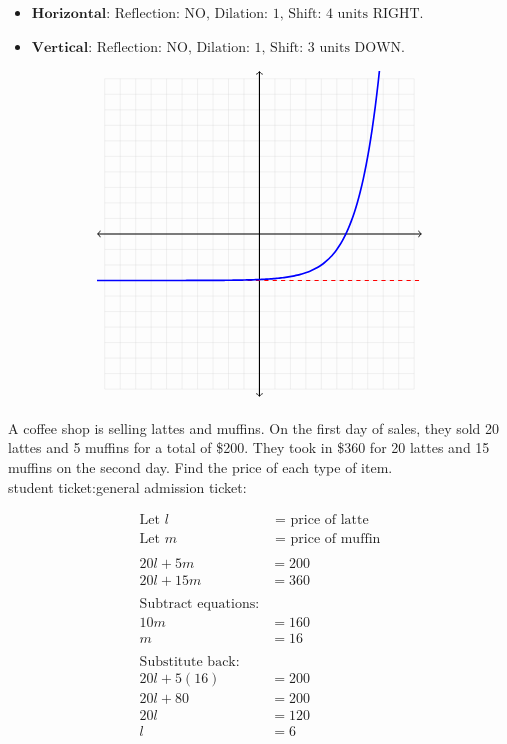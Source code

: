 \documentclass[addpoints]{exam}
\begin{document}
\begin{questions}
\begin{center}
\end{center}
\begin{solution}
\begin{itemize}
\item
 \(\textbf{Horizontal: } \text{Reflection: NO, Dilation: 1, Shift: 4 units RIGHT.}\) 

\item
 \(\textbf{Vertical: } \text{Reflection: NO, Dilation: 1, Shift: 3 units DOWN.}\) 

\end{itemize}


 \[\begin{tikzpicture}[scale=0.39] \draw[step=1cm, gray!40, very thin] (-10,-10) grid (10,10); \draw[thick, <->] (-10.5,0) -- (10.5,0); \draw[thick, <->] (0,-10.5) -- (0,10.5); \clip (-10.5,-10.5) rectangle (10.5,10.5);\draw[dashed, red, thick] (-10.5, -3) -- (10.5, -3);\draw[blue, very thick, samples=100, domain=-10.5000000000000:8.643856189774723, smooth] plot (\x, {pow(2, \x - (4)) + (-3)});\end{tikzpicture}\]
\end{solution}
\newpage


\question[6]  A coffee shop is selling lattes and muffins. On the first day of sales, they sold 20 lattes and 5 muffins for a total of \$200. They took in \$360 for 20 lattes and 15 muffins on the second day. Find the price of each type of item.
\\
student ticket:\fillin{}general admission ticket:\fillin
\begin{solution}
\[\begin{aligned} \text{Let } l &\text{ = price of latte} \\ \text{Let } m &\text{ = price of muffin} \\ \\ 20l + 5m &= 200 \\ 20l + 15m &= 360 \\ \\ \text{Subtract equations:} & \\ 10m &= 160 \\ m &= 16 \\ \\ \text{Substitute back:} & \\ 20l + 5(16) &= 200 \\ 20l + 80 &= 200 \\ 20l &= 120 \\ l &= 6 \end{aligned}\]


\end{solution}
\end{questions}
\end{document}
